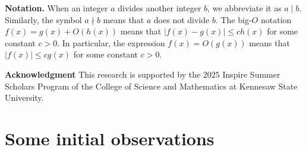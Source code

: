 \documentclass[12pt]{article}
\begin{document}
\bigskip

{\bf Notation.} When an integer $a$ divides another integer $b$, we abbreviate it as $a \mid b$. Similarly, the symbol $a \nmid b$ means that $a$ does not divide $b$. The big-$O$ notation $f(x) = g(x) + O(h(x))$ means that $|f(x) - g(x)| \leq c h(x)$ for some constant $c > 0$. In particular, the expression $f(x) = O(g(x))$ means that $|f(x)| \le c g(x)$ for some constant $c > 0$.

\bigskip

{\bf Acknowledgment} This research is supported by the $2025$ Inspire Summer Scholars Program of the College of Science and Mathematics at Kennesaw State University.

 \section{Some initial observations}
\end{document}
